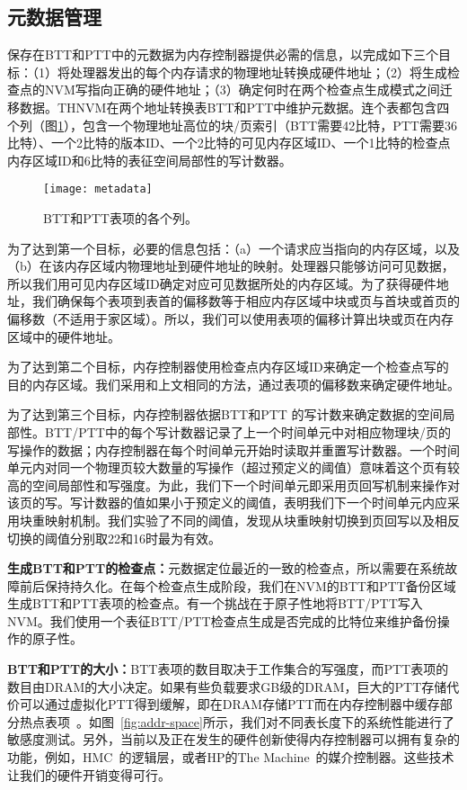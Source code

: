\subsection{元数据管理}

保存在BTT和PTT中的元数据为内存控制器提供必需的信息，以完成如下三个目标：（1）将处理器发出的每个内存请求的物理地址转换成硬件地址；（2）将生成检查点的NVM写指向正确的硬件地址；（3）确定何时在两个检查点生成模式之间迁移数据。THNVM在两个地址转换表BTT和PTT中维护元数据。连个表都包含四个列（图\ref{fig:metadata}），包含一个物理地址高位的块/页索引（BTT需要42比特，PTT需要36比特）、一个2比特的版本ID、一个2比特的可见内存区域ID、一个1比特的检查点内存区域ID和6比特的表征空间局部性的写计数器。 

\begin{figure}[!h]
\centering
\texttt{[image: metadata]}
\caption{BTT和PTT表项的各个列。}
\label{fig:metadata}
\end{figure}

为了达到第一个目标，必要的信息包括：（a）一个请求应当指向的内存区域，以及（b）在该内存区域内物理地址到硬件地址的映射。处理器只能够访问可见数据，所以我们用可见内存区域ID确定对应可见数据所处的内存区域。为了获得硬件地址，我们确保每个表项到表首的偏移数等于相应内存区域中块或页与首块或首页的偏移数（不适用于家区域）。所以，我们可以使用表项的偏移计算出块或页在内存区域中的硬件地址。 

为了达到第二个目标，内存控制器使用检查点内存区域ID来确定一个检查点写的目的内存区域。我们采用和上文相同的方法，通过表项的偏移数来确定硬件地址。 

为了达到第三个目标，内存控制器依据BTT和PTT 的写计数来确定数据的空间局部性。BTT/PTT中的每个写计数器记录了上一个时间单元中对相应物理块/页的写操作的数据；内存控制器在每个时间单元开始时读取并重置写计数器。一个时间单元内对同一个物理页较大数量的写操作（超过预定义的阈值）意味着这个页有较高的空间局部性和写强度。为此，我们下一个时间单元即采用页回写机制来操作对该页的写。写计数器的值如果小于预定义的阈值，表明我们下一个时间单元内应采用块重映射机制。我们实验了不同的阈值，发现从块重映射切换到页回写以及相反切换的阈值分别取22和16时最为有效。
 
\textbf{生成BTT和PTT的检查点：}元数据定位最近的一致的检查点，所以需要在系统故障前后保持持久化。在每个检查点生成阶段，我们在NVM的BTT和PTT备份区域生成BTT和PTT表项的检查点。有一个挑战在于原子性地将BTT/PTT写入NVM。我们使用一个表征BTT/PTT检查点生成是否完成的比特位来维护备份操作的原子性。 

\textbf{BTT和PTT的大小：}BTT表项的数目取决于工作集合的写强度，而PTT表项的数目由DRAM的大小决定。如果有些负载要求GB级的DRAM，巨大的PTT存储代价可以通过虚拟化PTT得到缓解，即在DRAM存储PTT而在内存控制器中缓存部分热点表项~\cite{Meza2012, Yoon2010, Burcea2008}。如图~\ref{fig:addr-space}所示，我们对不同表长度下的系统性能进行了敏感度测试。另外，当前以及正在发生的硬件创新使得内存控制器可以拥有复杂的功能，例如，HMC~\cite{HMC:2011}的逻辑层，或者HP的The Machine~\cite{TheMachine:2015}的媒介控制器。这些技术让我们的硬件开销变得可行。


